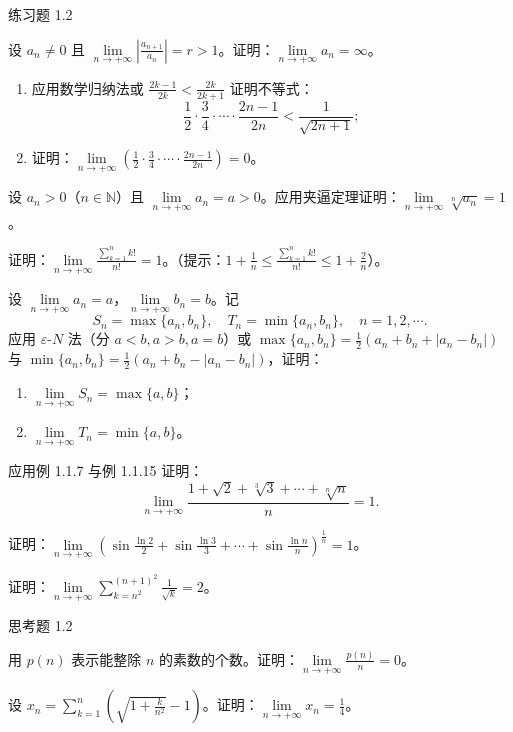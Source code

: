 \begin{exblock}{练习题 1.2}
\item 设 $a_{n} \neq 0$ 且 $\lim\limits_{n \to +\infty} \left| \frac{a_{n+1}}{a_n} \right| = r > 1$。证明：$\lim\limits_{n \to +\infty} a_{n} = \infty$。

\item 
\begin{enumerate}
  \item 应用数学归纳法或 $\frac{2k-1}{2k} < \frac{2k}{2k+1}$ 证明不等式：
  \[
  \frac{1}{2} \cdot \frac{3}{4} \cdot \cdots \cdot \frac{2n-1}{2n} < \frac{1}{\sqrt{2n+1}};
\]
  \item 证明：$\lim\limits_{n \to +\infty} \left( \frac{1}{2} \cdot \frac{3}{4} \cdot \cdots \cdot \frac{2n-1}{2n} \right) = 0$。
\end{enumerate}

\item 设 $a_n > 0$（$n \in \mathbb{N}$）且 $\lim\limits_{n \to +\infty} a_n = a > 0$。应用夹逼定理证明：$\lim\limits_{n \to +\infty} \sqrt[n]{a_n} = 1$。

\item 证明：$\lim\limits_{n \to +\infty} \frac{\sum\limits_{k=1}^{n} k!}{n!} = 1$。（提示：$1 + \frac{1}{n} \leqslant \frac{\sum\limits_{k=1}^{n} k!}{n!} \leqslant 1 + \frac{2}{n}$）。

\item 设 $\lim\limits_{n\to+\infty}a_n=a$，$\lim\limits_{n\to+\infty}b_n=b$。记
\[
S_{n}=\max\{a_{n},b_{n}\},\quad T_{n}=\min\{a_{n},b_{n}\},\quad n=1,2,\cdots.
\]
应用 $\varepsilon\text{-}N$ 法（分 $a<b, a>b, a=b$）或 $\max\{a_n, b_n\} = \frac{1}{2}(a_n + b_n + |a_n - b_n|)$ 与 $\min\{a_{n},b_{n}\}=\frac{1}{2}(a_{n}+b_{n}-|a_{n}-b_{n}|)$，证明：
\begin{enumerate}
  \item $\lim\limits_{n \to +\infty} S_n = \max\{a, b\}$；
  \item $\lim\limits_{n \to +\infty} T_n = \min\{a, b\}$。
\end{enumerate}

\item 应用例 1.1.7 与例 1.1.15 证明：
\[
\lim_{n\to+\infty}\frac{1+\sqrt{2}+\sqrt[3]{3}+\cdots+\sqrt[n]{n}}{n}=1.
\]

\item 证明：$\lim\limits_{n\to+\infty}\left(\sin\frac{\ln2}{2}+\sin\frac{\ln3}{3}+\cdots+\sin\frac{\ln n}{n}\right)^{\frac{1}{n}}=1$。

\item 证明：$\lim\limits_{n \to +\infty} \sum\limits_{k=n^{2}}^{(n+1)^{2}} \frac{1}{\sqrt{k}} = 2$。
\end{exblock}

\begin{exblock}{思考题 1.2}
\item 用 $p(n)$ 表示能整除 $n$ 的素数的个数。证明：$\lim\limits_{n\to+\infty}\frac{p(n)}{n}=0$。
\item 设 $x_{n} = \sum\limits_{k=1}^{n} \left( \sqrt{1 + \frac{k}{n^{2}}} - 1 \right)$。证明：$\lim\limits_{n \to +\infty} x_{n} = \frac{1}{4}$。
\end{exblock}
